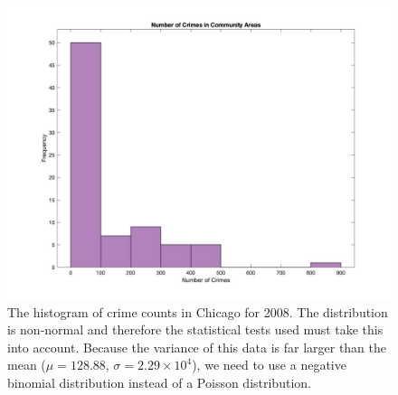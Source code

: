 \documentclass{article}
\begin{document}
\begin{figure} [htbp] \centering
 \includegraphics[scale=0.35]{figures/CrimeCountHist.jpg}
 \caption{The histogram of crime counts in Chicago for 2008. The distribution is non-normal and therefore the statistical tests used must take this into account. Because the variance of this data is far larger than the mean ($\mu = 128.88$, $\sigma = 2.29 \times 10^4$), we need to use a negative binomial distribution instead of a Poisson distribution.}
\end{figure}
\end{document}
